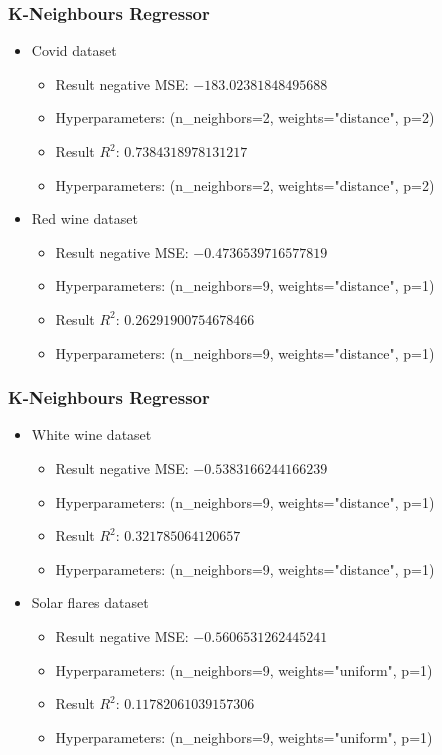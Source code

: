 \documentclass{beamer}
\begin{document}
\frame
{
  \frametitle{K-Neighbours Regressor}

  \begin{itemize}
    \item Covid dataset
    \begin{itemize}
      \item Result negative MSE: $-183.02381848495688$
      \item Hyperparameters: (n\_neighbors=2, weights="distance", p=2)
      \item Result $R^{2}$: $0.7384318978131217$
      \item Hyperparameters: (n\_neighbors=2, weights="distance", p=2)
    \end{itemize}
    \item Red wine dataset
    \begin{itemize}
      \item Result negative MSE: $-0.4736539716577819$
      \item Hyperparameters: (n\_neighbors=9, weights="distance", p=1)
      \item Result $R^{2}$: $0.26291900754678466$
      \item Hyperparameters: (n\_neighbors=9, weights="distance", p=1)
    \end{itemize}
  \end{itemize}
}

\frame
{
  \frametitle{K-Neighbours Regressor}

  \begin{itemize}
    \item White wine dataset
    \begin{itemize}
      \item Result negative MSE: $-0.5383166244166239$
      \item Hyperparameters: (n\_neighbors=9, weights="distance", p=1)
      \item Result $R^{2}$: $0.321785064120657$
      \item Hyperparameters: (n\_neighbors=9, weights="distance", p=1)
    \end{itemize}
    \item Solar flares dataset
    \begin{itemize}
      \item Result negative MSE: $-0.5606531262445241$
      \item Hyperparameters: (n\_neighbors=9, weights="uniform", p=1)
      \item Result $R^{2}$: $0.11782061039157306$
      \item Hyperparameters: (n\_neighbors=9, weights="uniform", p=1)
    \end{itemize}
  \end{itemize}
}
\end{document}
